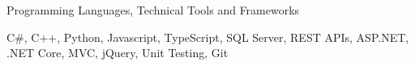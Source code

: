 \begin{cventries}
  \cventry
    {Programming Languages, Technical Tools and Frameworks}
    {}
    {}
    {}
    {
      \begin{cvitems}
        \item {C\#, C++, Python, Javascript, TypeScript, SQL Server, REST APIs, ASP.NET, .NET Core, MVC, jQuery, Unit Testing, Git}
      \end{cvitems}
    }

\end{cventries}
